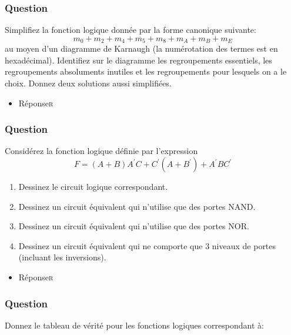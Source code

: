 \documentclass[11pt]{article}
\begin{document}
\subsubsection*{Question}
\label{sec:org646694a}
Simplifiez la fonction logique donnée par la forme canonique
  suivante:
  $$
    m_0 + m_2 + m_4 + m_5 + m_8 + m_A + m_B + m_E
    $$
  au
  moyen d'un diagramme de Karnaugh (la numérotation des termes est en
  hexadécimal). Identifiez sur le diagramme les regroupements
  essentiels, les regroupements absoluments inutiles et les
  regroupements pour lesquels on a le choix. Donnez deux solutions
  aussi simplifiées.

\begin{itemize}
\item Réponse\hfill{}\textsc{r}
\label{sec:orgf3bcda5}
\end{itemize}

\subsubsection*{Question}
\label{sec:orga3cdcb9}
Considérez la fonction logique définie par l'expression
  $$
    F =
      (A + B) A^{\prime} C + C^{\prime}(A+B^{\prime}) + A^{\prime}B
      C^{\prime}
    $$

\begin{enumerate}
\item Dessinez le circuit logique correspondant.

\item Dessinez un circuit équivalent qui n'utilise que des portes
NAND.

\item Dessinez un circuit équivalent qui n'utilise que des portes
NOR.

\item Dessinez un circuit équivalent qui ne comporte que 3 niveaux de
portes (incluant les inversions).
\end{enumerate}

\begin{itemize}
\item Réponse\hfill{}\textsc{r}
\label{sec:org53ba1a9}
\end{itemize}

\subsubsection*{Question}
\label{sec:org5939d06}
Donnez le tableau de vérité pour les fonctions logiques correspondant
  à:
\end{document}
